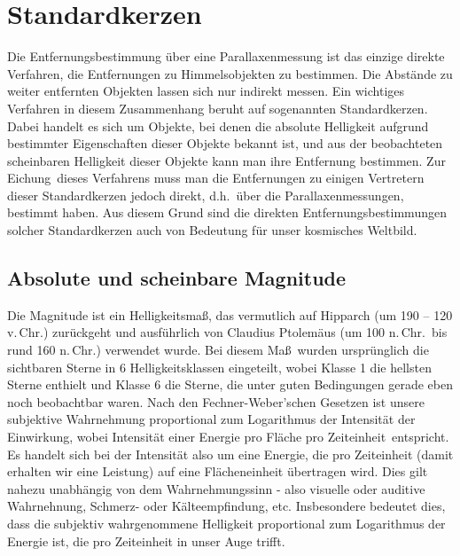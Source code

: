\section{Standardkerzen}

Die Entfernungsbestimmung \"uber eine Parallaxenmessung ist das einzige direkte Verfahren, die
Entfernungen zu Himmelsobjekten zu bestimmen. Die Abst\"ande zu weiter entfernten Objekten
lassen sich nur indirekt messen. Ein wichtiges Verfahren in diesem Zusammenhang beruht auf sogenannten
Standardkerzen. 
Dabei handelt es sich um Objekte, bei denen die absolute Helligkeit aufgrund
bestimmter Eigenschaften dieser Objekte bekannt ist, und aus der beobachteten scheinbaren Helligkeit
dieser Objekte kann man ihre Entfernung bestimmen. 
Zur \glqq Eichung\grqq\ dieses Verfahrens muss man die Entfernungen zu einigen Vertretern dieser
Standardkerzen jedoch direkt, d.h.\ \"uber die Parallaxenmessungen, bestimmt haben. Aus diesem
Grund sind die direkten Entfernungsbestimmungen solcher Standardkerzen auch von Bedeutung f\"ur 
unser kosmisches Weltbild. 

\subsection{Absolute und scheinbare Magnitude}

Die Magnitude 
ist ein Helligkeitsma\ss, das vermutlich auf 
Hipparch (um 190 -- 120 v.\,Chr.) 
zur\"uckgeht und ausf\"uhrlich von Claudius Ptolem\"aus (um 100 n.\,Chr.\ bis rund 160 n.\,Chr.)
verwendet wurde. Bei diesem Ma\ss\ wurden urspr\"unglich
die sichtbaren Sterne in 6 Helligkeitsklassen eingeteilt, wobei Klasse 1 die hellsten Sterne
enthielt und Klasse 6 die Sterne, die unter guten Bedingungen gerade eben noch beobachtbar waren. 
Nach den Fechner-Weber'schen Gesetzen 
ist unsere subjektive Wahrnehmung 
proportional zum Logarithmus der Intensit\"at der Einwirkung, wobei Intensit\"at einer \glqq Energie pro Fl\"ache pro
Zeiteinheit\grqq\ entspricht. Es handelt sich bei der Intensit\"at also um eine Energie, die pro Zeiteinheit
(damit erhalten wir eine Leistung) auf eine Fl\"acheneinheit \"ubertragen wird. Dies gilt nahezu unabh\"angig von dem
Wahrnehmungssinn - also visuelle oder auditive Wahrnehnung, Schmerz- oder K\"alteempfindung, etc. 
Insbesondere bedeutet dies,
dass die subjektiv wahrgenommene Helligkeit proportional zum Logarithmus der Energie ist, die pro Zeiteinheit 
in unser Auge trifft. 

